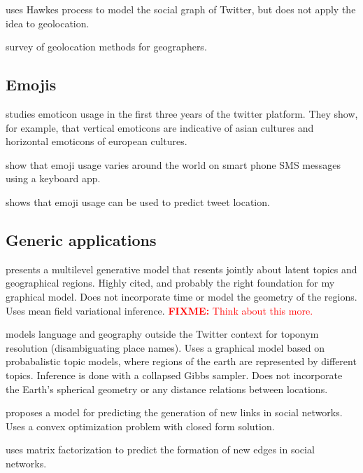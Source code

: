 \documentclass[sigconf,10pt]{acmart}
\newcommand{\fixme}[1]{\textcolor{red}{\textbf{FIXME:} {#1}}}
\begin{document}
\citet{he2015hawkestopic} uses Hawkes process to model the social graph of Twitter,
but does not apply the idea to geolocation.

\citet{graham2014world} survey of geolocation methods for geographers.


\subsection{Emojis}

\citet{park2013emoticon} studies emoticon usage in the first three years of the twitter platform.
They show, for example, that vertical emoticons are indicative of asian cultures and horizontal emoticons of european cultures.

\citet{lu2016learning} show that emoji usage varies around the world on smart phone SMS messages using a keyboard app.

\citet{ljubevsic2016global} shows that emoji usage can be used to predict tweet location.


\subsection{Generic applications}

\citet{eisenstein2010latent} presents a multilevel generative model that resents jointly about latent topics and geographical regions.
Highly cited, and probably the right foundation for my graphical model.
Does not incorporate time or model the geometry of the regions.
Uses mean field variational inference.
\fixme{Think about this more.}

\citet{speriosu2010connecting} models language and geography outside the Twitter context for toponym resolution (disambiguating place names).
Uses a graphical model based on probabalistic topic models,
where regions of the earth are represented by different topics.
Inference is done with a collapsed Gibbs sampler.
Does not incorporate the Earth's spherical geometry or any distance relations between locations.

\citet{wu2017link} proposes a model for predicting the generation of new links in social networks. 
Uses a convex optimization problem with closed form solution.

\citet{yu2017temporally} uses matrix factorization to predict the formation of new edges in social networks.
\end{document}
